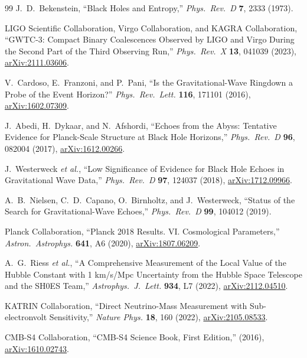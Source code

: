 \documentclass[12pt,a4paper,twocolumn]{article}
\begin{document}
\begin{thebibliography}{99}
J.~D.~Bekenstein,
``Black Holes and Entropy,''
\textit{Phys.~Rev.~D} \textbf{7}, 2333 (1973).

LIGO Scientific Collaboration, Virgo Collaboration, and KAGRA Collaboration,
``GWTC-3: Compact Binary Coalescences Observed by LIGO and Virgo During the Second Part of the Third Observing Run,''
\textit{Phys.~Rev.~X} \textbf{13}, 041039 (2023),
\href{https://arxiv.org/abs/2111.03606}{arXiv:2111.03606}.

V.~Cardoso, E.~Franzoni, and P.~Pani,
``Is the Gravitational-Wave Ringdown a Probe of the Event Horizon?''
\textit{Phys.~Rev.~Lett.} \textbf{116}, 171101 (2016),
\href{https://arxiv.org/abs/1602.07309}{arXiv:1602.07309}.

J.~Abedi, H.~Dykaar, and N.~Afshordi,
``Echoes from the Abyss: Tentative Evidence for Planck-Scale Structure at Black Hole Horizons,''
\textit{Phys.~Rev.~D} \textbf{96}, 082004 (2017),
\href{https://arxiv.org/abs/1612.00266}{arXiv:1612.00266}.

J.~Westerweck \textit{et al.},
``Low Significance of Evidence for Black Hole Echoes in Gravitational Wave Data,''
\textit{Phys.~Rev.~D} \textbf{97}, 124037 (2018),
\href{https://arxiv.org/abs/1712.09966}{arXiv:1712.09966}.

A.~B.~Nielsen, C.~D.~Capano, O.~Birnholtz, and J.~Westerweck,
``Status of the Search for Gravitational-Wave Echoes,''
\textit{Phys.~Rev.~D} \textbf{99}, 104012 (2019).

Planck Collaboration,
``Planck 2018 Results. VI. Cosmological Parameters,''
\textit{Astron.~Astrophys.} \textbf{641}, A6 (2020),
\href{https://arxiv.org/abs/1807.06209}{arXiv:1807.06209}.

A.~G.~Riess \textit{et al.},
``A Comprehensive Measurement of the Local Value of the Hubble Constant with 1 km/s/Mpc Uncertainty from the Hubble Space Telescope and the SH0ES Team,''
\textit{Astrophys.~J.~Lett.} \textbf{934}, L7 (2022),
\href{https://arxiv.org/abs/2112.04510}{arXiv:2112.04510}.

KATRIN Collaboration,
``Direct Neutrino-Mass Measurement with Sub-electronvolt Sensitivity,''
\textit{Nature Phys.} \textbf{18}, 160 (2022),
\href{https://arxiv.org/abs/2105.08533}{arXiv:2105.08533}.

CMB-S4 Collaboration,
``CMB-S4 Science Book, First Edition,''
(2016),
\href{https://arxiv.org/abs/1610.02743}{arXiv:1610.02743}.


\end{thebibliography}
\end{document}
